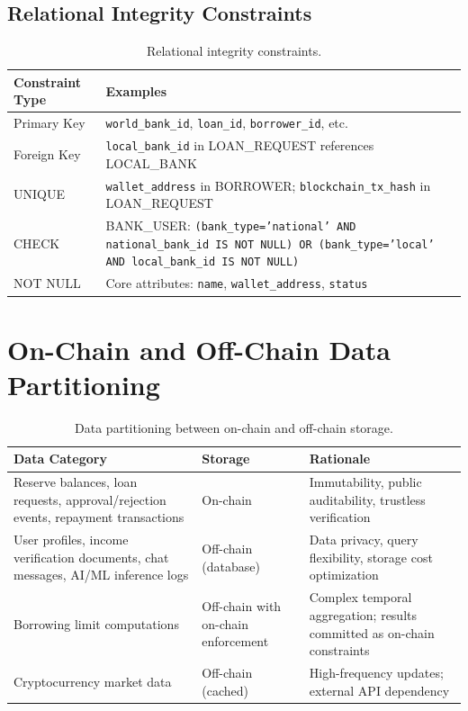 \documentclass[12pt,a4paper]{report}
\newcommand{\tableheadfont}{\bfseries\small\color{PrimaryBlue}}
\newenvironment{moderntable}[1][H]{%
    \begin{table}[#1]\centering\small%
    \renewcommand{\arraystretch}{1.35}%
}{%
    \end{table}%
}
\begin{document}
\subsection{Relational Integrity Constraints}

\begin{moderntable}
\caption{Relational integrity constraints.}
\begin{tabular}{@{} >{\raggedright}p{2.5cm} >{\raggedright\arraybackslash}p{9.5cm} @{}}
\toprule
\tableheadfont Constraint Type & \tableheadfont Examples \\
\midrule
\rowcolor{RowShade}
Primary Key & \texttt{world\_bank\_id}, \texttt{loan\_id}, \texttt{borrower\_id}, etc. \\
Foreign Key & \texttt{local\_bank\_id} in LOAN\_REQUEST references LOCAL\_BANK \\
\rowcolor{RowShade}
UNIQUE & \texttt{wallet\_address} in BORROWER; \texttt{blockchain\_tx\_hash} in LOAN\_REQUEST \\
CHECK & BANK\_USER: \texttt{(bank\_type='national' AND national\_bank\_id IS NOT NULL) OR (bank\_type='local' AND local\_bank\_id IS NOT NULL)} \\
\rowcolor{RowShade}
NOT NULL & Core attributes: \texttt{name}, \texttt{wallet\_address}, \texttt{status} \\
\bottomrule
\end{tabular}
\end{moderntable}


\section{On-Chain and Off-Chain Data Partitioning}

\begin{moderntable}
\caption{Data partitioning between on-chain and off-chain storage.}
\begin{tabular}{@{} >{\raggedright}p{4.2cm} >{\raggedright}p{2.5cm} >{\raggedright\arraybackslash}p{5.3cm} @{}}
\toprule
\tableheadfont Data Category & \tableheadfont Storage & \tableheadfont Rationale \\
\midrule
\rowcolor{RowShade}
Reserve balances, loan requests, approval/rejection events, repayment transactions & On-chain & Immutability, public auditability, trustless verification \\
User profiles, income verification documents, chat messages, AI/ML inference logs & Off-chain (database) & Data privacy, query flexibility, storage cost optimization \\
\rowcolor{RowShade}
Borrowing limit computations & Off-chain with on-chain enforcement & Complex temporal aggregation; results committed as on-chain constraints \\
Cryptocurrency market data & Off-chain (cached) & High-frequency updates; external API dependency \\
\bottomrule
\end{tabular}
\end{moderntable}
\end{document}
